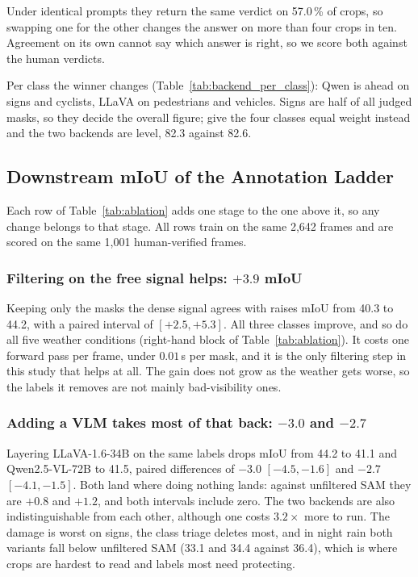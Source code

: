 \documentclass[journal]{IEEEtran}
\begin{document}
Under identical prompts they return the same verdict on 57.0\,\% of crops, so swapping one for the other changes the answer on more than four crops in ten.
Agreement on its own cannot say which answer is right, so we score both against the human verdicts.

Per class the winner changes (Table~\ref{tab:backend_per_class}): Qwen is ahead on signs and cyclists, LLaVA on pedestrians and vehicles.
Signs are half of all judged masks, so they decide the overall figure; give the four classes equal weight instead and the two backends are level, 82.3 against 82.6.







\subsection{Downstream mIoU of the Annotation Ladder}
\label{exp:ladder}

Each row of Table~\ref{tab:ablation} adds one stage to the one above it, so any change belongs to that stage.
All rows train on the same 2{,}642 frames and are scored on the same 1{,}001 human-verified frames.

\subsubsection{Filtering on the free signal helps: $+3.9$ mIoU}
Keeping only the masks the dense signal agrees with raises mIoU from 40.3 to 44.2, with a paired interval of $[+2.5, +5.3]$.
All three classes improve, and so do all five weather conditions (right-hand block of Table~\ref{tab:ablation}).
It costs one forward pass per frame, under $0.01$\,s per mask, and it is the only filtering step in this study that helps at all.
The gain does not grow as the weather gets worse, so the labels it removes are not mainly bad-visibility ones.


\subsubsection{Adding a VLM takes most of that back: $-3.0$ and $-2.7$}
Layering LLaVA-1.6-34B on the same labels drops mIoU from 44.2 to 41.1 and Qwen2.5-VL-72B to 41.5, paired differences of $-3.0$ $[-4.5, -1.6]$ and $-2.7$ $[-4.1, -1.5]$.
Both land where doing nothing lands: against unfiltered SAM they are $+0.8$ and $+1.2$, and both intervals include zero.
The two backends are also indistinguishable from each other, although one costs $3.2\times$ more to run.
The damage is worst on signs, the class triage deletes most, and in night rain both variants fall below unfiltered SAM (33.1 and 34.4 against 36.4), which is where crops are hardest to read and labels most need protecting.
\end{document}
